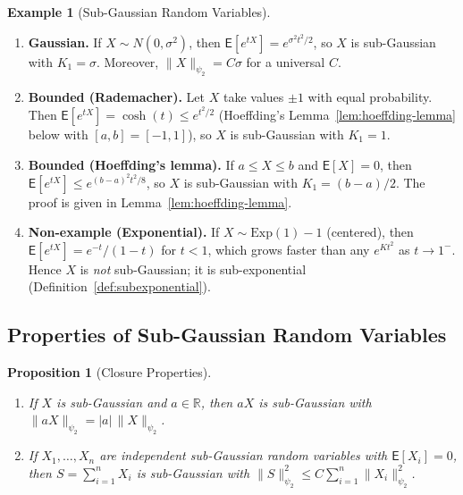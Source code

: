 \documentclass[14pt]{extarticle}
\theoremstyle{plain}
\newtheorem{proposition}[theorem]{Proposition}
\theoremstyle{definition}
\newtheorem{example}{Example}[section]
\theoremstyle{remark}
\newcommand\expc{\mathsf{E}}
\newcommand{\Real}{\mathbb{R}}
\begin{document}
\begin{example}[Sub-Gaussian Random Variables]\label{ex:subgaussian}
\leavevmode
\begin{enumerate}[label=\textup{(\arabic*)}]
\item \textbf{Gaussian.} If $X \sim N(0, \sigma^2)$, then $\expc[e^{tX}] = e^{\sigma^2 t^2/2}$, so $X$ is sub-Gaussian with $K_1 = \sigma$. Moreover, $\|X\|_{\psi_2} = C\sigma$ for a universal $C$.

\item \textbf{Bounded (Rademacher).} Let $X$ take values $\pm 1$ with equal probability. Then $\expc[e^{tX}] = \cosh(t) \leqslant e^{t^2/2}$ (Hoeffding's Lemma~\ref{lem:hoeffding-lemma} below with $[a,b] = [-1,1]$), so $X$ is sub-Gaussian with $K_1 = 1$.

\item \textbf{Bounded (Hoeffding's lemma).} If $a \leqslant X \leqslant b$ and $\expc[X] = 0$, then $\expc[e^{tX}] \leqslant e^{(b-a)^2t^2/8}$, so $X$ is sub-Gaussian with $K_1 = (b-a)/2$. The proof is given in Lemma~\ref{lem:hoeffding-lemma}.

\item \textbf{Non-example (Exponential).} If $X \sim \mathrm{Exp}(1) - 1$ (centered), then $\expc[e^{tX}] = e^{-t}/(1-t)$ for $t < 1$, which grows faster than any $e^{Kt^2}$ as $t \to 1^-$. Hence $X$ is \emph{not} sub-Gaussian; it is sub-exponential (Definition~\ref{def:subexponential}).
\end{enumerate}
\end{example}

\subsection{Properties of Sub-Gaussian Random Variables}

\begin{proposition}[Closure Properties]\label{prop:sg-closure}
\leavevmode
\begin{enumerate}[label=\textup{(\roman*)}]
\item If $X$ is sub-Gaussian and $a \in \Real$, then $aX$ is sub-Gaussian with $\|aX\|_{\psi_2} = |a|\,\|X\|_{\psi_2}$.
\item If $X_1, \ldots, X_n$ are independent sub-Gaussian random variables with $\expc[X_i] = 0$, then $S = \sum_{i=1}^n X_i$ is sub-Gaussian with $\|S\|_{\psi_2}^2 \leqslant C\sum_{i=1}^n \|X_i\|_{\psi_2}^2$.
\end{enumerate}
\end{proposition}
\end{document}
